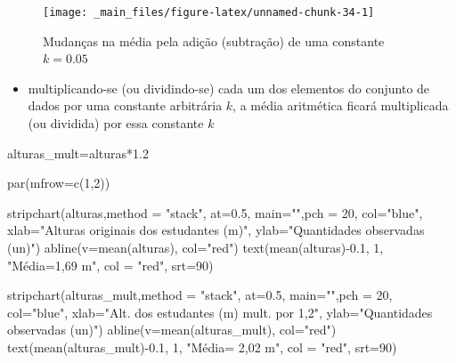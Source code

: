 \documentclass[
]{book}
\newenvironment{Shaded}{\begin{snugshade}}{\end{snugshade}}
\newcommand{\AttributeTok}[1]{\textcolor[rgb]{0.77,0.63,0.00}{#1}}
\newcommand{\DecValTok}[1]{\textcolor[rgb]{0.00,0.00,0.81}{#1}}
\newcommand{\FloatTok}[1]{\textcolor[rgb]{0.00,0.00,0.81}{#1}}
\newcommand{\FunctionTok}[1]{\textcolor[rgb]{0.00,0.00,0.00}{#1}}
\newcommand{\NormalTok}[1]{#1}
\newcommand{\OtherTok}[1]{\textcolor[rgb]{0.56,0.35,0.01}{#1}}
\newcommand{\SpecialCharTok}[1]{\textcolor[rgb]{0.00,0.00,0.00}{#1}}
\newcommand{\StringTok}[1]{\textcolor[rgb]{0.31,0.60,0.02}{#1}}
\providecommand{\tightlist}{%
  \setlength{\itemsep}{0pt}\setlength{\parskip}{0pt}}
\begin{document}
\begin{figure}

{\centering \texttt{[image: \_main\_files/figure-latex/unnamed-chunk-34-1]} 

}

\caption{Mudanças na média pela adição (subtração) de uma constante $k=0.05$}\label{fig:unnamed-chunk-34}
\end{figure}

\begin{itemize}
\tightlist
\item
  multiplicando-se (ou dividindo-se) cada um dos elementos do conjunto de dados por uma constante arbitrária \(k\), a média aritmética ficará multiplicada (ou dividida) por essa constante \(k\)
\end{itemize}

\begin{Shaded}
\begin{Highlighting}[]
\NormalTok{alturas\_mult}\OtherTok{=}\NormalTok{alturas}\SpecialCharTok{*}\FloatTok{1.2}

\FunctionTok{par}\NormalTok{(}\AttributeTok{mfrow=}\FunctionTok{c}\NormalTok{(}\DecValTok{1}\NormalTok{,}\DecValTok{2}\NormalTok{))}

\FunctionTok{stripchart}\NormalTok{(alturas,}\AttributeTok{method =} \StringTok{"stack"}\NormalTok{,  }\AttributeTok{at=}\FloatTok{0.5}\NormalTok{, }
\AttributeTok{main=}\StringTok{""}\NormalTok{,}\AttributeTok{pch =} \DecValTok{20}\NormalTok{,}
\AttributeTok{col=}\StringTok{"blue"}\NormalTok{,  }\AttributeTok{xlab=}\StringTok{"Alturas originais dos estudantes (m)"}\NormalTok{, }
\AttributeTok{ylab=}\StringTok{"Quantidades observadas (un)"}\NormalTok{)}
\FunctionTok{abline}\NormalTok{(}\AttributeTok{v=}\FunctionTok{mean}\NormalTok{(alturas), }\AttributeTok{col=}\StringTok{"red"}\NormalTok{) }
\FunctionTok{text}\NormalTok{(}\FunctionTok{mean}\NormalTok{(alturas)}\SpecialCharTok{{-}}\FloatTok{0.1}\NormalTok{, }\DecValTok{1}\NormalTok{, }\StringTok{"Média=1,69 m"}\NormalTok{, }\AttributeTok{col =} \StringTok{"red"}\NormalTok{, }\AttributeTok{srt=}\DecValTok{90}\NormalTok{) }


\FunctionTok{stripchart}\NormalTok{(alturas\_mult,}\AttributeTok{method =} \StringTok{"stack"}\NormalTok{,  }\AttributeTok{at=}\FloatTok{0.5}\NormalTok{, }
\AttributeTok{main=}\StringTok{""}\NormalTok{,}\AttributeTok{pch =} \DecValTok{20}\NormalTok{,}
\AttributeTok{col=}\StringTok{"blue"}\NormalTok{,  }\AttributeTok{xlab=}\StringTok{"Alt. dos estudantes (m) mult. por 1,2"}\NormalTok{, }
\AttributeTok{ylab=}\StringTok{"Quantidades observadas (un)"}\NormalTok{)}
\FunctionTok{abline}\NormalTok{(}\AttributeTok{v=}\FunctionTok{mean}\NormalTok{(alturas\_mult), }\AttributeTok{col=}\StringTok{"red"}\NormalTok{) }
\FunctionTok{text}\NormalTok{(}\FunctionTok{mean}\NormalTok{(alturas\_mult)}\SpecialCharTok{{-}}\FloatTok{0.1}\NormalTok{, }\DecValTok{1}\NormalTok{, }\StringTok{"Média= 2,02 m"}\NormalTok{, }\AttributeTok{col =} \StringTok{"red"}\NormalTok{, }\AttributeTok{srt=}\DecValTok{90}\NormalTok{) }
\end{Highlighting}
\end{Shaded}
\end{document}
